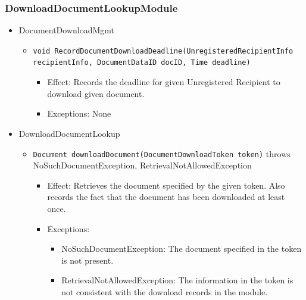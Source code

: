 \documentclass[a4paper,10pt]{article}
\begin{document}
\subsubsection*{DownloadDocumentLookupModule}
\begin{itemize}
    \item DocumentDownloadMgmt
    \begin{itemize}
        \item \texttt{void RecordDocumentDownloadDeadline(UnregisteredRecipientInfo recipientInfo, DocumentDataID docID, Time deadline)}
        \begin{itemize}
            \item Effect: Records the deadline for given Unregistered Recipient to download given document.
            \item Exceptions: None
        \end{itemize}
    \end{itemize}

    \item DownloadDocumentLookup
    \begin{itemize}
        \item \texttt{Document downloadDocument(DocumentDownloadToken token)} throws NoSuchDocumentException, RetrievalNotAllowedException
        \begin{itemize}
            \item Effect: Retrieves the document specified by the given token. Also records the fact that the document has been downloaded at least once.
            \item Exceptions:
            \begin{itemize}
                \item NoSuchDocumentException: The document specified in the token is not present.
                \item RetrievalNotAllowedException: The information in the token is not consistent with the download records in the module.
            \end{itemize}
        \end{itemize}
    \end{itemize}
\end{itemize}
\end{document}
